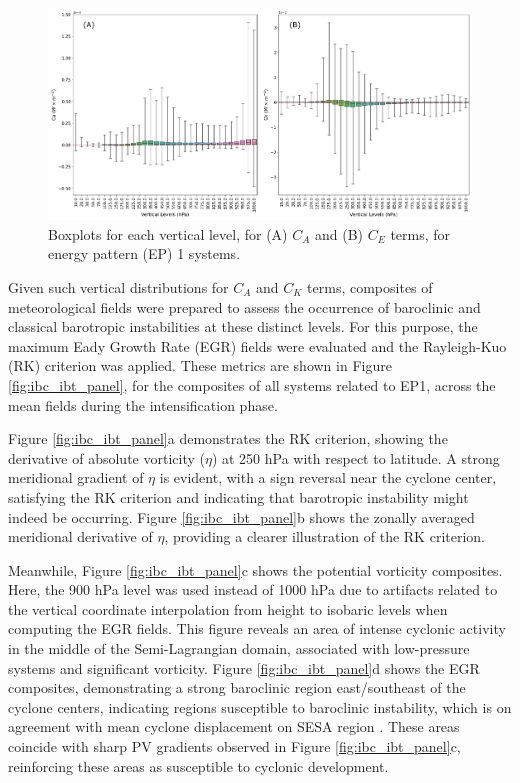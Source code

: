 \begin{figure}[!htbp]
    \centering
    \includegraphics[width=\textwidth]{figs_6/levels_ibc_ibt.pdf}
    \caption[Ca and Ck - Vertical Distribution]{Boxplots for each vertical level, for (A) $C_A$ and (B) $C_E$ terms, for energy pattern (EP) 1 systems.}
    \label{fig:levels_ibc_ibt}
\end{figure}

Given such vertical distributions for $C_A$ and $C_K$ terms, composites of meteorological fields were prepared to assess the occurrence of baroclinic and classical barotropic instabilities at these distinct levels. For this purpose, the maximum Eady Growth Rate (EGR) fields were evaluated and the Rayleigh-Kuo (RK) criterion was applied. These metrics are shown in Figure \ref{fig:ibc_ibt_panel}, for the composites of all systems related to EP1, across the mean fields during the intensification phase.

Figure \ref{fig:ibc_ibt_panel}a demonstrates the RK criterion, showing the derivative of absolute vorticity ($\eta$) at 250 hPa with respect to latitude. A strong meridional gradient of $\eta$ is evident, with a sign reversal near the cyclone center, satisfying the RK criterion and indicating that barotropic instability might indeed be occurring. Figure \ref{fig:ibc_ibt_panel}b shows the zonally averaged meridional derivative of $\eta$, providing a clearer illustration of the RK criterion.

Meanwhile, Figure \ref{fig:ibc_ibt_panel}c shows the potential vorticity composites. Here, the 900 hPa level was used instead of 1000 hPa due to artifacts related to the vertical coordinate interpolation from height to isobaric levels when computing the EGR fields. This figure reveals an area of intense cyclonic activity in the middle of the Semi-Lagrangian domain, associated with low-pressure systems and significant vorticity. Figure \ref{fig:ibc_ibt_panel}d shows the EGR composites, demonstrating a strong baroclinic region east/southeast of the cyclone centers, indicating regions susceptible to baroclinic instability, which is on agreement with mean cyclone displacement on SESA region \citep{hoskins2005new,gramcianinov2019properties}. These areas coincide with sharp PV gradients observed in Figure \ref{fig:ibc_ibt_panel}c, reinforcing these areas as susceptible to cyclonic development.

